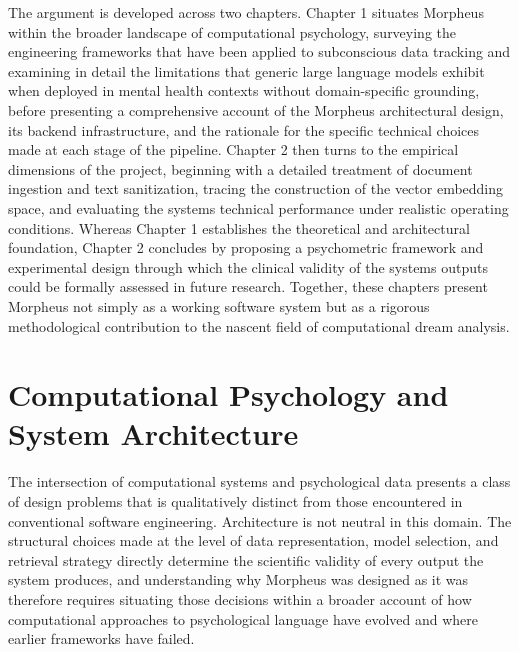\documentclass[12pt,a4paper]{report}
\begin{document}
The argument is developed across two chapters. Chapter 1 situates Morpheus within the broader landscape of computational psychology, surveying the engineering frameworks that have been applied to subconscious data tracking and examining in detail the limitations that generic large language models exhibit when deployed in mental health contexts without domain-specific grounding, before presenting a comprehensive account of the Morpheus architectural design, its backend infrastructure, and the rationale for the specific technical choices made at each stage of the pipeline. Chapter 2 then turns to the empirical dimensions of the project, beginning with a detailed treatment of document ingestion and text sanitization, tracing the construction of the vector embedding space, and evaluating the system\textquotesingle{}s technical performance under realistic operating conditions. Whereas Chapter 1 establishes the theoretical and architectural foundation, Chapter 2 concludes by proposing a psychometric framework and experimental design through which the clinical validity of the system\textquotesingle{}s outputs could be formally assessed in future research. Together, these chapters present Morpheus not simply as a working software system but as a rigorous methodological contribution to the nascent field of computational dream analysis.

\chapter{Computational Psychology and System Architecture}
The intersection of computational systems and psychological data presents a class of design problems that is qualitatively distinct from those encountered in conventional software engineering. Architecture is not neutral in this domain. The structural choices made at the level of data representation, model selection, and retrieval strategy directly determine the scientific validity of every output the system produces, and understanding why Morpheus was designed as it was therefore requires situating those decisions within a broader account of how computational approaches to psychological language have evolved and where earlier frameworks have failed.
\end{document}
